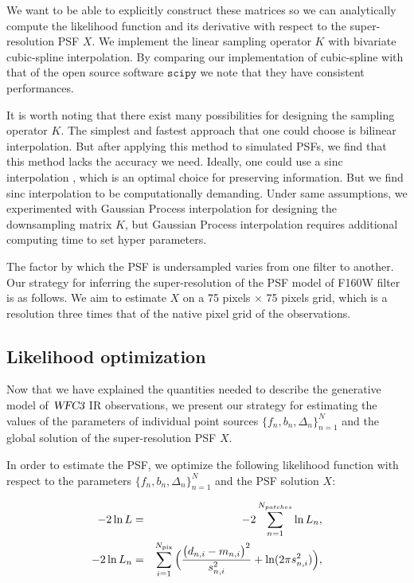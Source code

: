 We want to be able to explicitly construct these matrices so we can analytically compute the likelihood function and its derivative with respect to the super-resolution PSF $X$. 
We implement the linear sampling operator $K$ with bivariate cubic-spline interpolation. By comparing our implementation of cubic-spline with that of the open source 
software $\mathtt{scipy}$ we note that they have consistent performances.

It is worth noting that there exist many possibilities for designing the sampling operator $K$.  The simplest and fastest approach that one could 
choose is bilinear interpolation. But after applying this method to simulated PSFs, we find that this method lacks the accuracy we 
need. Ideally, one could use a sinc interpolation \citep{bickerton,galsim}, which is an optimal choice for preserving information.
But we find sinc interpolation to be computationally demanding. Under same assumptions, we experimented with Gaussian Process interpolation for designing the downsampling matrix $K$, but Gaussian Process interpolation requires additional computing time to set hyper parameters.


The factor by which the PSF is undersampled varies from one filter to another. Our strategy for inferring the super-resolution of the PSF model of F160W filter is as follows. 
We aim to estimate $X$ on a 75 pixels $\times$ 75 pixels grid, which is a resolution three times that of the native pixel grid of the observations.

\subsection{Likelihood optimization}

Now that we have explained the quantities needed to describe the generative model of ${\textsl{WFC3}}$ IR observations, we 
present our strategy for estimating the values of the parameters of individual point sources $\{f_{n},b_{n},\Delta_{n}\}_{n=1}^{N}$ and 
the global solution of the super-resolution PSF $X$.


In order to estimate the PSF, we optimize the following likelihood function with respect to the parameters $\{f_{n},b_{n},\Delta_{n}\}_{n=1}^{N}$ and the PSF solution $X$:

\begin{eqnarray} -2 \ln L &=& -2 \sum_{n=1}^{N_{patches}} \ln L_{n} \label{eq:total} , \\
-2 \ln L_{n} &=& \sum_{i=1}^{N_{\rm pix}} \Big( \frac{\big(d_{n,i} - m_{n,i} \big)^{2}}{s^{2}_{n,i}} + \ln(2 \pi s_{n,i}^{2}) \Big) \label{eq:patch},
\end{eqnarray}

